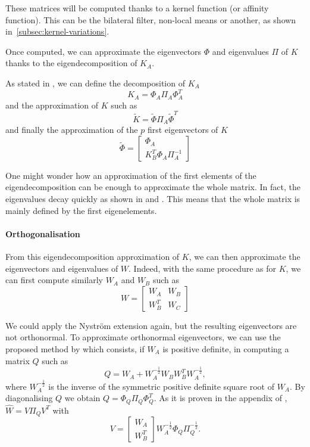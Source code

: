 These matrices will be computed thanks to a kernel function (or affinity function). This can be the bilateral filter, non-local means or another, as shown in~\ref{subsec:kernel-variations}.

Once computed, we can approximate the eigenvectors \(\Phi\) and eigenvalues \(\Pi\) of \(K\) thanks to the eigendecomposition of \(K_A\).

As stated in \cite{glide_2014}, we can define the decomposition of \(K_A\)
\[K_A = \Phi_A \Pi_A \Phi_A^T\]
and the approximation of \(K\) such as
\[\tilde{K} = \tilde{\Phi} \Pi_A \tilde{\Phi}^T\]
and finally the approximation of the \(p\) first eigenvectors of \(K\)
\[
 \tilde{\Phi} = \begin{bmatrix}
  \Phi_A \\
  K_B^T \Phi_A \Pi_A^{-1}
 \end{bmatrix}
\]

One might wonder how an approximation of the first elements of the eigendecomposition can be enough to approximate the whole matrix.
In fact, the eigenvalues decay quickly as shown in \cite{siam_slides_2016} and \cite{meyer_perturbation_2014}. This means that the whole matrix is mainly defined by the first eigenelements.

\paragraph{Orthogonalisation}
From this eigendecomposition approximation of \(K\), we can then approximate the eigenvectors and eigenvalues of \(W\).
Indeed, with the same procedure as for \(K\), we can first compute similarly \(W_A\) and \(W_B\) such as
\[
 W = \begin{bmatrix}
  W_A & W_B \\
  W_B^T & W_C
 \end{bmatrix}
\]

We could apply the Nystr\"om extension again, but the resulting eigenvectors are not orthonormal.
To approximate orthonormal eigenvectors, we can use the proposed method by \cite{fowlkes_spectral_2004} which consists, if \(W_A\) is positive definite, in computing a matrix \(Q\) such as
\[Q = W_A + W_A^{-\frac{1}{2}} W_B W_B^T W_A^{-\frac{1}{2}},\]
where \(W_A^{-\frac{1}{2}}\) is the inverse of the symmetric positive definite square root of \(W_A\).
By diagonalising \(Q\) we obtain \(Q = \Phi_Q \Pi_Q \Phi_Q^T\).
As it is proven in the appendix of \cite{fowlkes_spectral_2004}, \(\hat{W} = V\Pi_QV^T\) with
\[
 V = \begin{bmatrix}
  W_A \\
  W_B^T
 \end{bmatrix}
 W_A^{-\frac{1}{2}} \Phi_Q \Pi_Q^{-\frac{1}{2}}.
\]

